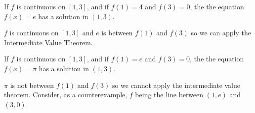 \documentclass{ximera}
\begin{document}
\begin{exercise}
\begin{exercise}
\begin{exercise}
\begin{exercise}
If $f$ is continuous on $\left[1,3\right]$, and if $f(1) = 4$ and $f(3) = 0$, the the equation $f(x) = e$ has a solution in $\left(1,3\right)$.

\begin{multipleChoice}
\end{multipleChoice}

\begin{feedback}
$f$ is continuous on $\left[1,3\right]$ and $e$ is between $f(1)$ and $f(3)$ so we can apply the Intermediate Value Theorem.
\end{feedback}

\begin{exercise}

If $f$ is continuous on $\left[1,3\right]$, and if $f(1) = e$ and $f(3) = 0$, the the equation $f(x) = \pi$ has a solution in $\left(1,3\right)$.

\begin{multipleChoice}
\end{multipleChoice}

\begin{feedback}
$\pi$ is not between $f(1)$ and $f(3)$ so we cannot apply the intermediate value theorem.  Consider, as a counterexample, $f$ being the line between $(1,e)$ and $(3,0)$.
\end{feedback}

\end{exercise}
\end{exercise}
\end{exercise}
\end{exercise}
\end{exercise}
\end{document}
